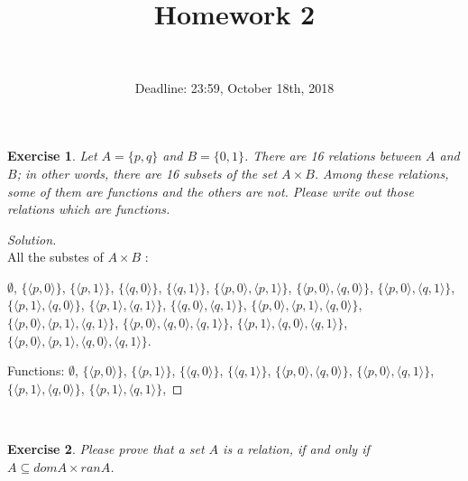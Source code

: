 \documentclass[12pt,a4paper,utf8]{article}
\title{Homework 2}
\author{\\
}
\date{Deadline: 23:59, October 18th, 2018}
\theoremstyle{plain}
\newtheorem{exercise}{Exercise}
\begin{document}
\maketitle

\begin{exercise}
Let $A = \{ p , q \}$ and $B = \{ 0 , 1 \}$.
There are 16 relations between $A$ and $B$; in other words, there are 16 subsets of the set $A \times B$.
Among these relations, some of them are functions and the others are not.
Please write out those relations which are functions.
\end{exercise}

\begin{proof}[Solution]\ \\
    All the substes of $A \times B$ :

$\emptyset$,
$\{\langle p,0 \rangle \}$, 
$\{\langle p,1 \rangle \}$, 
$\{\langle q,0 \rangle \}$, 
$\{\langle q,1 \rangle \}$, 
$\{\langle p,0 \rangle , \langle p,1 \rangle \}$,
$\{\langle p,0 \rangle , \langle q,0 \rangle \}$,
$\{\langle p,0 \rangle , \langle q,1 \rangle \}$,
$\{\langle p,1 \rangle , \langle q,0 \rangle \}$,
$\{\langle p,1 \rangle , \langle q,1 \rangle \}$,
$\{\langle q,0 \rangle , \langle q,1 \rangle \}$,
$\{\langle p,0 \rangle , \langle p,1 \rangle , \langle q,0 \rangle \}$,
$\{\langle p,0 \rangle , \langle p,1 \rangle , \langle q,1 \rangle \}$,
$\{\langle p,0 \rangle , \langle q,0 \rangle , \langle q,1 \rangle \}$,
$\{\langle p,1 \rangle , \langle q,0 \rangle , \langle q,1 \rangle \}$,
$\{\langle p,0 \rangle , \langle p,1 \rangle , \langle q,0 \rangle , \langle q,1 \rangle \}$.

Functions:
$\emptyset$,
$\{\langle p,0 \rangle \}$,
$\{\langle p,1 \rangle \}$, 
$\{\langle q,0 \rangle \}$, 
$\{\langle q,1 \rangle \}$, 
$\{\langle p,0 \rangle , \langle q,0 \rangle \}$,
$\{\langle p,0 \rangle , \langle q,1 \rangle \}$,
$\{\langle p,1 \rangle , \langle q,0 \rangle \}$,
$\{\langle p,1 \rangle , \langle q,1 \rangle \}$,


\end{proof}

\ \\
\begin{exercise}
Please prove that a set $A$ is a relation, if and only if $A \subseteq dom A \times ran A$.
\end{exercise}
\end{document}

